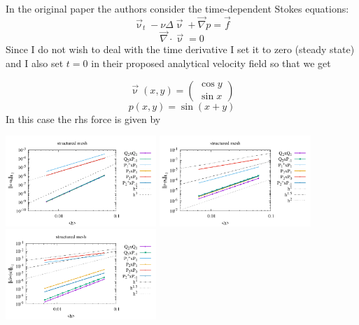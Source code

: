In the original paper \cite{lire19} the authors consider the time-dependent Stokes equations:
\[
\vec\upnu_t - \nu \Delta \vec\upnu + \vec\nabla p = \vec f 
\]
\[
\vec\nabla \cdot \vec\upnu = 0
\]
Since I do not wish to deal with the time derivative I set it to zero (steady state)
and I also set $t=0$ in their proposed analytical velocity field so that we get

\[
\vec\upnu (x,y) = 
\left(
\begin{array}{c}
\cos y \\
\sin x
\end{array}
\right)
\]
\[
p(x,y)=\sin(x+y)
\]
In this case the rhs force is given by 



\begin{center}
\includegraphics[width=5.7cm]{python_codes/fieldstone_120/paperresults/lire19_structured_errorsV.pdf}
\includegraphics[width=5.7cm]{python_codes/fieldstone_120/paperresults/lire19_structured_errorsP.pdf}
\includegraphics[width=5.7cm]{python_codes/fieldstone_120/paperresults/lire19_structured_errors_divv.pdf}\\
\end{center}

